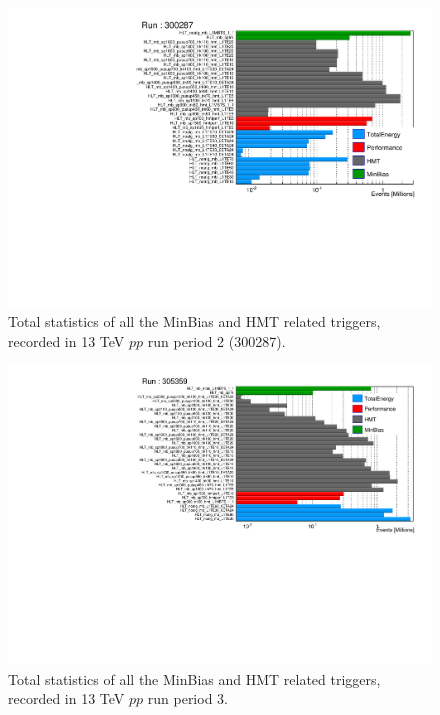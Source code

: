 \begin{figure}[H]
\centering
\includegraphics[width=.9\linewidth]{figs/sec_evtSlc/stat_pp13_run2_2.pdf}
\caption{Total statistics of all the MinBias and HMT related triggers, recorded in 13 TeV $pp$ run period 2 (300287).}
\label{fig:stat_pp13_run2}
\end{figure}

\begin{figure}[H]
\centering
\includegraphics[width=.9\linewidth]{figs/sec_evtSlc/stat_pp13_run3.pdf}
\caption{Total statistics of all the MinBias and HMT related triggers, recorded in 13 TeV $pp$ run period 3.}
\label{fig:stat_pp13_run3}
\end{figure}

